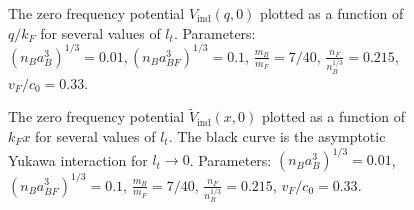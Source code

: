 \begin{figure} 
\begin{center}  
  
\caption{The zero frequency potential $V_{\text{ind}}(q,0)$ plotted as a function of $q/k_F$ for several values of $l_t$. Parameters: $(n_Ba_B^3)^{1/3} = 0.01, (n_Ba_{BF}^3)^{1/3} = 0.1$, $\frac{m_B}{m_F} = 7/40$, $\frac{n_F}{n_B^{1/3}} = 0.215$, $v_F/c_0 = 0.33$.}  
\label{fig.Vq}  
\end{center}    
\end{figure}

\begin{figure} 
\begin{center}  
  
\caption{The zero frequency potential $\tilde{V}_{\text{ind}}(x,0)$ plotted as a function of $k_Fx$ for several values of $l_t$. The black curve is the asymptotic Yukawa interaction for $l_t \to 0$. Parameters: $(n_Ba_B^3)^{1/3} = 0.01$, $(n_Ba_{BF}^3)^{1/3} = 0.1$, $\frac{m_B}{m_F} = 7/40$, $\frac{n_F}{n_B^{1/3}} = 0.215$, $v_F/c_0 = 0.33$.}  
\label{fig.Vx}  
\end{center}    
\end{figure}


